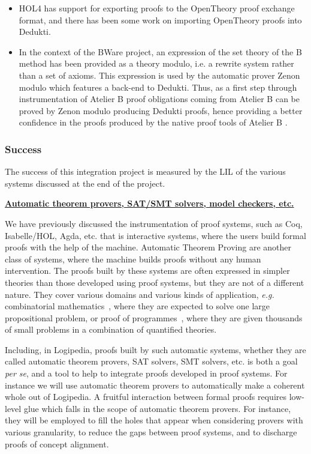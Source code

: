 \begin{itemize}
\item HOL4 has support for exporting proofs to the OpenTheory proof
  exchange format, and there has been some work on importing
  OpenTheory proofs into Dedukti.

\item In the context of the BWare project, an expression of the set
  theory of the B method has been provided as a theory modulo, i.e. a
  rewrite system rather than a set of axioms. This expression is used
  by the automatic prover Zenon modulo which features a back-end to
  Dedukti. Thus, as a first step through instrumentation of Atelier B
  proof obligations coming from Atelier B can be proved by Zenon
  modulo producing Dedukti proofs, hence providing a better confidence
  in the proofs produced by the native proof tools of Atelier B
  \cite{Bware}.
\end{itemize}

\subsubsection*{Success}

The success of this integration project is measured by the LIL of the various
systems discussed at the end of the project.

\bigskip

\noindent
{\bf \Large \underline{Automatic theorem provers, SAT/SMT solvers, model checkers, etc.}}

\medskip

We have previously discussed the instrumentation of proof systems,
such as Coq, Isabelle/HOL, Agda, etc.  that is interactive systems,
where the users build formal proofs with the help of the
machine. Automatic Theorem Proving are another class of systems, where
the machine builds proofs without any human intervention. The proofs
built by these systems are often expressed in simpler theories than
those developed using proof systems, but they are not of a different
nature.  They cover various domains and various kinds of application,
{\em e.g.}  combinatorial
mathematics~\cite{DBLP:journals/ai/KonevL15,DBLP:conf/sat/HeuleKM16},
where they are expected to solve one large propositional problem, or
proof of
programmes~\cite{DBLP:conf/esop/FilliatreP13,DBLP:journals/pacmpl/ProtzenkoZRRWBD17},
where they are given thousands of small problems in a combination of
quantified theories.

Including, in Logipedia, proofs built by such automatic systems,
whether they are called automatic theorem provers, SAT solvers, SMT
solvers, etc. is both a goal {\em per se}, and a tool to help to
integrate proofs developed in proof systems.  For instance we will use
automatic theorem provers to automatically make a coherent whole out
of Logipedia. A fruitful interaction between formal proofs requires
low-level glue which falls in the scope of automatic theorem provers.
For instance, they will be employed to fill the holes that appear when
considering provers with various granularity, to reduce the gaps
between proof systems, and to discharge proofs of concept alignment.

